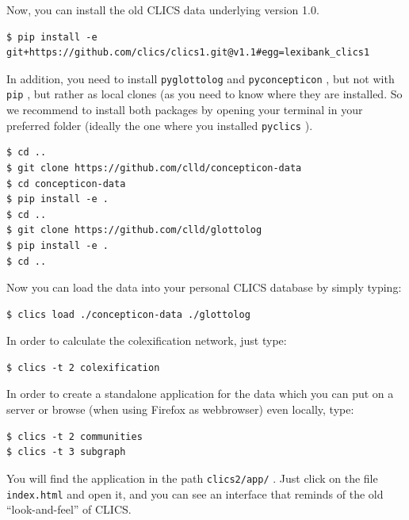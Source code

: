\documentclass[
  english,
  a4paper,
  oneside,tablecaptionabove
]{scrbook}
\newcommand{\passthrough}[1]{#1}
\begin{document}
Now, you can install the old CLICS data underlying version 1.0.

\begin{lstlisting}
$ pip install -e git+https://github.com/clics/clics1.git@v1.1#egg=lexibank_clics1
\end{lstlisting}

In addition, you need to install \passthrough{\lstinline!pyglottolog!}
and \passthrough{\lstinline!pyconcepticon!} , but not with
\passthrough{\lstinline!pip!} , but rather as local clones (as you need
to know where they are installed. So we recommend to install both
packages by opening your terminal in your preferred folder (ideally the
one where you installed \passthrough{\lstinline!pyclics!} ).

\begin{lstlisting}
$ cd ..
$ git clone https://github.com/clld/concepticon-data
$ cd concepticon-data
$ pip install -e .
$ cd ..
$ git clone https://github.com/clld/glottolog
$ pip install -e .
$ cd ..
\end{lstlisting}

Now you can load the data into your personal CLICS database by simply
typing:

\begin{lstlisting}
$ clics load ./concepticon-data ./glottolog
\end{lstlisting}

In order to calculate the colexification network, just type:

\begin{lstlisting}
$ clics -t 2 colexification
\end{lstlisting}

In order to create a standalone application for the data which you can
put on a server or browse (when using Firefox as webbrowser) even
locally, type:

\begin{lstlisting}
$ clics -t 2 communities
$ clics -t 3 subgraph
\end{lstlisting}

You will find the application in the path
\passthrough{\lstinline!clics2/app/!} . Just click on the file
\passthrough{\lstinline!index.html!} and open it, and you can see an
interface that reminds of the old \enquote{look-and-feel} of CLICS.
\end{document}
